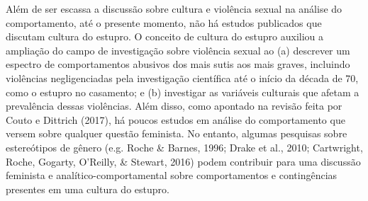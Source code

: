 Além de ser escassa a discussão sobre cultura e violência sexual na análise do comportamento, até o presente momento, não há estudos publicados que discutam cultura do estupro. O conceito de cultura do estupro auxiliou a ampliação do campo de investigação sobre violência sexual ao (a) descrever um espectro de comportamentos abusivos dos mais sutis aos mais graves, incluindo violências negligenciadas pela investigação científica até o início da década de 70, como o estupro no casamento; e (b) investigar as variáveis culturais que afetam a prevalência dessas violências. Além disso, como apontado na revisão feita por Couto e Dittrich (2017), há poucos estudos em análise do comportamento que versem sobre qualquer questão feminista. No entanto, algumas pesquisas sobre estereótipos de gênero (e.g. Roche \& Barnes, 1996; Drake et al., 2010; Cartwright, Roche, Gogarty, O'Reilly, \& Stewart, 2016) podem contribuir para uma discussão feminista e analítico-comportamental sobre comportamentos e contingências presentes em uma cultura do estupro.

